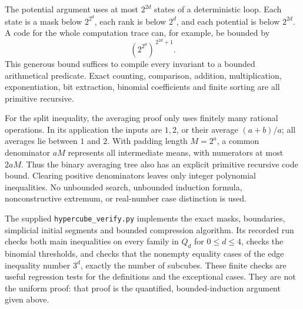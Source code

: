 The potential argument uses at most \(2^{2d}\) states of a deterministic
loop.  Each state is a mask below \(2^{2^d}\), each rank is below \(2^d\),
and each potential is below \(2^{2d}\).  A code for the whole computation
trace can, for example, be bounded by
\[
 (2^{2^d})^{\,2^{2d}+1}.
\]
This generous bound suffices to compile every invariant to a bounded
arithmetical predicate.  Exact counting, comparison, addition,
multiplication, exponentiation, bit extraction, binomial coefficients and
finite sorting are all primitive recursive.

For the split inequality, the averaging proof only uses finitely many
rational operations.  In its application the inputs are \(1,2\), or their
average \((a+b)/a\); all averages lie between \(1\) and \(2\).
With padding length \(M=2^a\), a common denominator \(aM\) represents
all intermediate means, with numerators at most \(2aM\).  Thus the
binary averaging tree also has an explicit primitive recursive code
bound.  Clearing positive denominators leaves only integer polynomial
inequalities.  No unbounded search, unbounded induction formula,
nonconstructive extremum, or real-number case distinction is used.

The supplied \texttt{hypercube\_verify.py} implements the exact masks,
boundaries, simplicial initial segments and bounded compression algorithm.
Its recorded run checks both main inequalities on every family in
\(Q_d\) for \(0\leq d\leq4\), checks the binomial thresholds, and
checks that the nonempty equality cases of the edge inequality number
\(3^d\), exactly the number of subcubes.  These finite checks are useful
regression tests for the definitions and the exceptional cases.  They are
not the uniform proof: that proof is the quantified, bounded-induction
argument given above.
